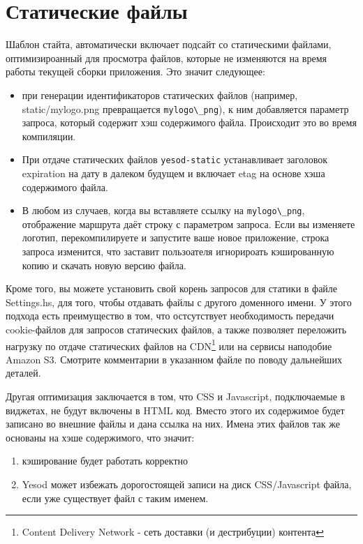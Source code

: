 \section{Статические файлы}

Шаблон стайта, автоматически включает подсайт со статическими файлами, оптимизироанный для просмотра
файлов, которые не изменяются на время работы текущей сборки приложения. Это значит следующее:

\begin{itemize}
  \item при генерации идентификаторов статических файлов (например, static/mylogo.png
    превращается  \lstinline!mylogo\_png!), к ним добавляется параметр запроса, который содержит
    хэш содержимого файла. Происходит это во время компиляции.
  \item При отдаче статических файлов \lstinline!yesod-static! устанавливает заголовок expiration
    на дату в далеком будущем и включает etag на основе хэша содержимого файла.
  \item В любом из случаев, когда вы вставляете  ссылку на \lstinline!mylogo\_png!, отображение
    маршрута даёт строку с параметром запроса. Если вы изменяете логотип, перекомпилируете и
    запустите ваше новое приложение, строка запроса изменится, что заставит пользоателя игнорироать
    кэшированную копию и скачать новую версию файла.
\end{itemize}

Кроме того, вы можете установить свой корень запросов для статики в файле Settings.hs, для того, чтобы
отдавать файлы  с другого доменного имени. У этого подхода есть преимущество в том, что остсутствует
необходимость передачи cookie-файлов для запросов статических файлов, а также позволяет переложить
нагрузку по отдаче статических файлов на CDN\footnote{Content Delivery Network - сеть доставки (и
дестрибуции) контента} или на сервисы наподобие Amazon S3. Смотрите комментарии в указанном файле
по поводу дальнейших деталей.

Другая оптимизация заключается в том, что CSS и Javascript, подключаемые в виджетах, не будут
включены в HTML код. Вместо этого их содержимое будет записано во внешние файлы и дана ссылка на них.
Имена этих файлов так же основаны на хэше содержимого, что значит:
\begin{enumerate}
  \item кэширование будет работать корректно
  \item Yesod может избежать дорогостоящей записи на диск CSS/Javascript файла, если уже существует
    файл с таким именем.
\end{enumerate}

